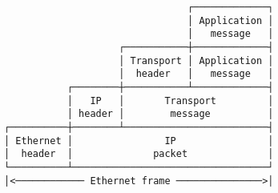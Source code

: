 \documentclass[varwidth=25cm,crop]{standalone}
\begin{document}
\begin{verbatim}
                                ┌─────────────┐
                                │ Application │
                                │   message   │
                    ┌───────────┼─────────────┤
                    │ Transport │ Application │
                    │  header   │   message   │
           ┌────────┼───────────┴─────────────┤
           │   IP   │       Transport         │
           │ header │        message          │
┌──────────┼────────┴─────────────────────────┤
│ Ethernet │                IP                │
│  header  │              packet              │
└──────────┴──────────────────────────────────┘
│<──────────── Ethernet frame ───────────────>│
\end{verbatim}
\end{document}
